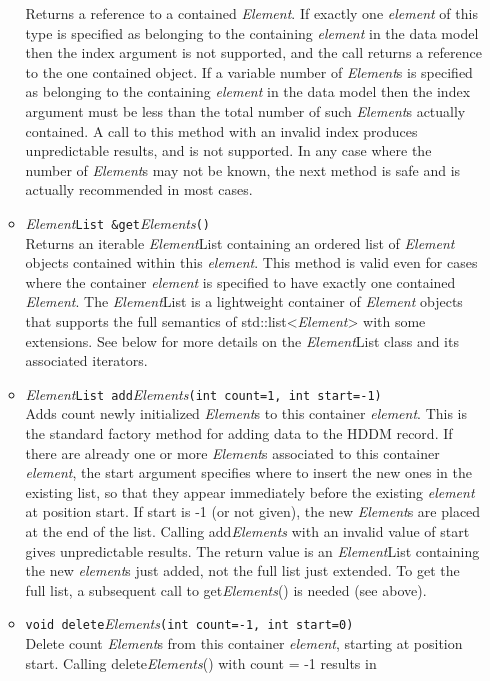 \documentclass{revtex4}
\begin{document}
\begin{itemize}
\begin{itemize}
Returns a reference to a contained {\em Element}. If exactly one {\em element}
of this type is specified as belonging to the containing {\em element} in the
data model then the index argument is not supported, and the call returns a
reference to the one contained object. If a variable number of {\em Element}s
is specified as belonging to the containing {\em element} in the data model
then the index argument must be less than the total number of such
{\em Element}s actually contained. A call to this method with an invalid index
produces unpredictable results, and is not supported. In any case where the
number of {\em Element}s may not be known, the next method is safe and is
actually recommended in most cases.
\item {\em Element}\texttt{List \&get}{\em Elements}\texttt{()}\\
Returns an iterable {\em Element}List containing an ordered list of 
{\em Element} objects contained within this {\em element}. This method is valid
even for cases where the container {\em element} is specified to have exactly
one contained {\em Element}. The {\em Element}List is a lightweight container
of {\em Element} objects that supports the full semantics of
std::list<{\em Element}> with some extensions. See below for more
details on the {\em Element}List class and its associated iterators.
\item {\em Element}\texttt{List add}{\em Elements}\texttt{(int count=1, int start=-1)}\\
Adds count newly initialized {\em Element}s to this container {\em element}.
This is the standard factory method for adding data to the HDDM record. If
there are already one or more {\em Element}s associated to this container
{\em element}, the start
argument specifies where to insert the new ones in the existing list, so that
they appear immediately before the existing {\em element} at position start.
If start is -1 (or not given), the new {\em Element}s are placed at the end
of the list. Calling add{\em Elements} with an invalid value of start gives
unpredictable results. The
return value is an {\em Element}List containing the new {\em element}s
just added, not the
full list just extended. To get the full list, a subsequent call to
get{\em Elements}() is needed (see above).
\item \texttt{void delete}{\em Elements}\texttt{(int count=-1, int start=0)}\\
Delete count {\em Element}s from this container {\em element}, starting at
position start. Calling delete{\em Elements}() with count = -1 results in

\end{itemize}
\end{itemize}
\end{document}
